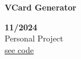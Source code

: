 \begin{minipage}{0.8\textwidth}
    \parbox{0.8\linewidth}{\textbf{VCard Generator}}  \hfill  \textbf{11/2024}\\
    Personal Project\\
    \href{https://github.com/JavierOramas/vcard-qr}{see code}\\
    \end{minipage} \hfill {}\\\\
